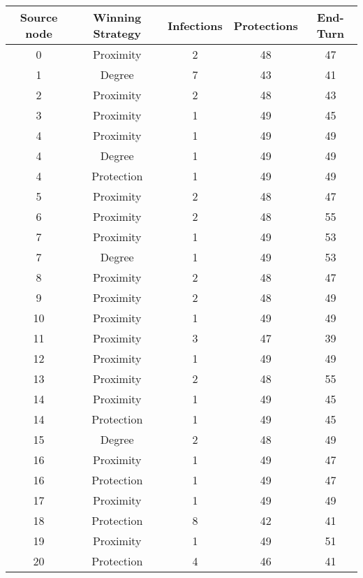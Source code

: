 \documentclass[results.tex]{subfiles}
\begin{document}
\begin{center}
  \begin{tabular}{| c || c | c | c | c |}
    \hline
    {\bfseries Source node} & {\bfseries Winning Strategy} & {\bfseries Infections} & {\bfseries Protections} & {\bfseries End-Turn} \\  %
    \hline\hline
    0 & Proximity & 2 & 48 & 47 \\ 
    \hline
    1 & Degree & 7 & 43 & 41 \\ 
    \hline
    2 & Proximity & 2 & 48 & 43 \\ 
    \hline
    3 & Proximity & 1 & 49 & 45 \\ 
    \hline
    4 & Proximity & 1 & 49 & 49 \\ 
    \hline
    4 & Degree & 1 & 49 & 49 \\ 
    \hline
    4 & Protection & 1 & 49 & 49 \\ 
    \hline
    5 & Proximity & 2 & 48 & 47 \\ 
    \hline
    6 & Proximity & 2 & 48 & 55 \\ 
    \hline
    7 & Proximity & 1 & 49 & 53 \\ 
    \hline
    7 & Degree & 1 & 49 & 53 \\ 
    \hline
    8 & Proximity & 2 & 48 & 47 \\ 
    \hline
    9 & Proximity & 2 & 48 & 49 \\ 
    \hline
    10 & Proximity & 1 & 49 & 49 \\ 
    \hline
    11 & Proximity & 3 & 47 & 39 \\ 
    \hline
    12 & Proximity & 1 & 49 & 49 \\ 
    \hline
    13 & Proximity & 2 & 48 & 55 \\ 
    \hline
    14 & Proximity & 1 & 49 & 45 \\ 
    \hline
    14 & Protection & 1 & 49 & 45 \\ 
    \hline
    15 & Degree & 2 & 48 & 49 \\ 
    \hline
    16 & Proximity & 1 & 49 & 47 \\ 
    \hline
    16 & Protection & 1 & 49 & 47 \\ 
    \hline
    17 & Proximity & 1 & 49 & 49 \\ 
    \hline
    18 & Protection & 8 & 42 & 41 \\ 
    \hline
    19 & Proximity & 1 & 49 & 51 \\ 
    \hline
    20 & Protection & 4 & 46 & 41 \\ 

\end{tabular}
\end{center}
\end{document}
